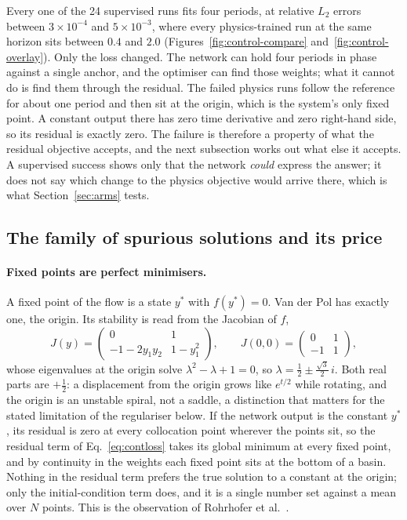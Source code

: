 \documentclass[11pt,a4paper]{article}
\begin{document}
Every one of the 24 supervised runs fits four periods, at relative
$L_2$ errors between $3\times10^{-4}$ and $5\times10^{-3}$, where every
physics-trained run at the same horizon sits between $0.4$ and $2.0$
(Figures~\ref{fig:control-compare} and~\ref{fig:control-overlay}). Only
the loss changed. The network can hold four periods in phase against a
single anchor, and the optimiser can find those weights; what it cannot
do is find them through the residual. The failed physics runs follow
the reference for about one period and then sit at the origin, which is
the system's only fixed point. A constant output there has zero time
derivative and zero right-hand side, so its residual is exactly zero.
The failure is therefore a property of what the residual objective
accepts, and the next subsection works out what else it accepts. A
supervised success shows only that the network \emph{could} express the
answer; it does not say which change to the physics objective would
arrive there, which is what Section~\ref{sec:arms} tests.

\subsection{The family of spurious solutions and its price}
\label{sec:splice}

\paragraph{Fixed points are perfect minimisers.}
A fixed point of the flow is a state $y^{\ast}$ with $f(y^{\ast}) = 0$.
Van der Pol has exactly one, the origin. Its stability is read from the
Jacobian of $f$,
\begin{equation}
  J(y) = \begin{pmatrix} 0 & 1 \\ -1 - 2 y_1 y_2 & 1 - y_1^2 \end{pmatrix},
  \qquad
  J(0,0) = \begin{pmatrix} 0 & 1 \\ -1 & 1 \end{pmatrix},
  \label{eq:jacobian}
\end{equation}
whose eigenvalues at the origin solve $\lambda^2 - \lambda + 1 = 0$,
so $\lambda = \tfrac12 \pm \tfrac{\sqrt{3}}{2}\,i$. Both real parts are
$+\tfrac12$: a displacement from the origin grows like $e^{t/2}$ while
rotating, and the origin is an unstable spiral, not a saddle, a
distinction that matters for the stated limitation of the regulariser
below. If the network output is the constant $y^{\ast}$, its residual is
zero at every collocation point wherever the points sit, so the
residual term of Eq.~\eqref{eq:contloss} takes its global minimum at
every fixed point, and by continuity in the weights each fixed point
sits at the bottom of a basin. Nothing in the residual term prefers the
true solution to a constant at the origin; only the initial-condition
term does, and it is a single number set against a mean over $N$
points. This is the observation of Rohrhofer et
al.~\cite{rohrhofer2023}.
\end{document}
